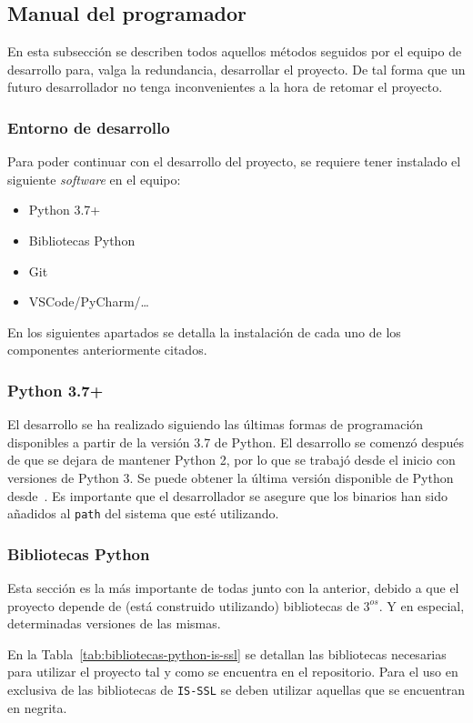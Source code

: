 \subsection{Manual del programador}
En esta subsección se describen todos aquellos métodos seguidos por el equipo de desarrollo para, valga la redundancia, desarrollar el proyecto. De tal forma que un futuro desarrollador no tenga inconvenientes a la hora de retomar el proyecto.

\subsubsection{Entorno de desarrollo}
Para poder continuar con el desarrollo del proyecto, se requiere tener instalado el siguiente \textit{software} en el equipo:
\begin{itemize}
\tightlist
\item Python 3.7+
\item Bibliotecas Python
\item Git
\item VSCode/PyCharm/\dots
\end{itemize}

En los siguientes apartados se detalla la instalación de cada uno de los componentes anteriormente citados.

\subsubsection{Python 3.7+}
El desarrollo se ha realizado siguiendo las últimas formas de programación disponibles a partir de la versión 3.7 de Python. El desarrollo se comenzó después de que se dejara de mantener Python 2, por lo que se trabajó desde el inicio con versiones de Python 3. Se puede obtener la última versión disponible de Python desde~\cite{pythonGetIt}. Es importante que el desarrollador se asegure que los binarios han sido añadidos al \texttt{path} del sistema que esté utilizando.

\subsubsection{Bibliotecas Python}
Esta sección es la más importante de todas junto con la anterior, debido a que el proyecto depende de (está construido utilizando) bibliotecas de $3^{os}$. Y en especial, determinadas versiones de las mismas. 

En la Tabla~\ref{tab:bibliotecas-python-is-ssl} se detallan las bibliotecas necesarias para utilizar el proyecto tal y como se encuentra en el repositorio. Para el uso en exclusiva de las bibliotecas de \texttt{IS-SSL} se deben utilizar aquellas que se encuentran en negrita.

